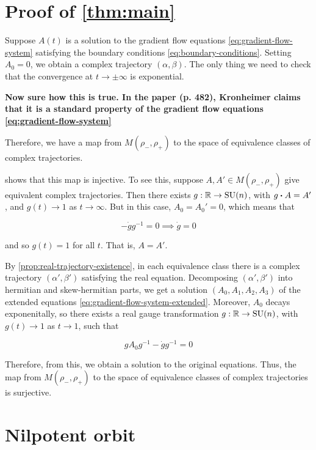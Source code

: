 \documentclass{report}
\DeclareMathOperator{\SU}{SU}
\begin{document}
\section{Proof of \cref{thm:main}}

\label{sec:proof-main}

Suppose \(A(t)\) is a solution to the gradient flow equations \cref{eq:gradient-flow-system} satisfying the boundary conditions \cref{eq:boundary-conditions}. Setting \(A_0 = 0\), we obtain a complex trajectory \((\alpha, \beta)\). The only thing we need to check that the convergence at \(t \to \pm\infty\) is exponential. 

\textbf{Now sure how this is true. In the paper (p. 482), Kronheimer claims that it is a standard property of the gradient flow equations \cref{eq:gradient-flow-system}}

Therefore, we have a map from \(M(\rho_-, \rho_+)\) to the space of equivalence classes of complex trajectories. 

 shows that this map is injective. To see this, suppose \(A, A' \in M(\rho_-, \rho_+)\) give equivalent complex trajectories. Then there exists \(g : \R \to \SU(n)\), with \(g \vdot A = A'\), and \(g(t) \to 1\) as \(t \to \infty\). But in this case, \(A_0 = A_0' = 0\), which means that

\[-\dot g g^{-1} = 0 \implies \dot g = 0\]

and so \(g(t) = 1\) for all \(t\). That is, \(A = A'\).

By \cref{prop:real-trajectory-existence}, in each equivalence class there is a complex trajectory \((\alpha', \beta')\) satisfying the real equation. Decomposing \((\alpha', \beta')\) into hermitian and skew-hermitian parts, we get a solution \((A_0, A_1, A_2, A_3)\) of the extended equations \cref{eq:gradient-flow-system-extended}. Moreover, \(A_0\) decays exponenitally, so there exists a real gauge transformation \(g : \R \to \SU(n)\), with \(g(t) \to 1\) as \(t \to 1\), such that

\[gA_0g^{-1} - \dot g g^{-1} = 0\]

Therefore, from this, we obtain a solution to the original equations. Thus, the map from \(M(\rho_-, \rho_+)\) to the space of equivalence classes of complex trajectories is surjective.

\label{sec:proof}

\section{Nilpotent orbit}
\end{document}
